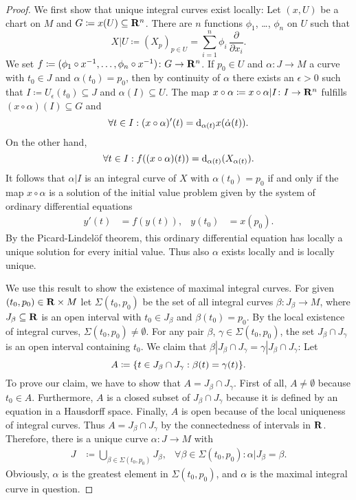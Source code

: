 \begin{proof}
  We first show that unique integral curves exist locally: Let $(x, U)$ be
  a chart on $M$ and $G \coloneqq x(U) \subseteq \mathbf{R}^n$. There are $n$
  functions $\phi_1$, \dots, $\phi_n$ on $U$ such that
  \[
    X|U \coloneqq (X_p)_{p \in U}
    = \sum_{i = 1}^n \phi_i \, \frac{\partial}{\partial x_i}.
  \]
  We set $f \coloneqq (\phi_1 \circ x^{-1}, \dotsc, \phi_n \circ x^{-1})
  \colon G \to \mathbf{R}^n$. If $p_0 \in U$ and $\alpha\colon J \to M$ a curve
  with $t_0 \in J$ and $\alpha(t_0) = p_0$, then by continuity of $\alpha$
  there exists an $\epsilon > 0$ such that
  $I \coloneqq U_\epsilon(t_0) \subseteq J$ and $\alpha(I) \subseteq U$. The
  map $x \circ \alpha \coloneqq x \circ \alpha|I\colon I \to \mathbf{R}^n$ fulfills
  $(x \circ \alpha)(I) \subseteq G$ and
  \[
    \forall t \in I : (x \circ \alpha)'(t) = \mathrm d_{\alpha(t)} x(\dot\alpha(t)).
  \]
  On the other hand,
  \[
    \forall t \in I: f((x \circ \alpha)(t)) = \mathrm d_{\alpha(t)}(X_{\alpha(t)}).
  \] 
  It follows that $\alpha|I$ is an integral curve of $X$ with $\alpha(t_0) = p_0$
  if and only if the map $x \circ \alpha$ is a solution of the initial
  value problem given by the system
  of ordinary differential equations
  \begin{align}
    \label{eq:ode}
    y'(t) & = f(y(t)), & y(t_0) & = x(p_0).
  \end{align}
  By the Picard-Lindelöf theorem, this ordinary differential equation has
  locally a unique solution for every initial value. Thus also $\alpha$ exists
  locally and is locally unique. 

  We use this result to show the existence of maximal integral curves. For given
  $(t_0, p_0) \in \mathbf{R} \times M$ let $\Sigma(t_0, p_0)$ be the set of all
  integral curves $\beta\colon J_\beta \to M$, where $J_\beta \subseteq \mathbf{R}$
  is an open interval with $t_0 \in J_\beta$ and $\beta(t_0) = p_0$.
  By the local existence of integral curves, $\Sigma(t_0, p_0) \neq \emptyset$.
  For any pair $\beta$, $\gamma \in \Sigma(t_0, p_0)$, the set $J_\beta \cap
  J_\gamma$ is an open interval containing $t_0$. We claim that $\beta|J_\beta
  \cap J_\gamma = \gamma|J_\beta \cap J_\gamma$: Let
  \[
    A \coloneqq \lbrace t \in J_\beta \cap J_\gamma : \beta(t) = \gamma(t)\rbrace.
  \]
  To prove our claim, we have to show that $A = J_\beta \cap J_\gamma$. First
  of all, $A \neq \emptyset$ because $t_0 \in A$. Furthermore, $A$ is a closed
  subset of $J_\beta \cap J_\gamma$ because it is defined by an equation in a
  Hausdorff space. Finally, $A$ is open because of the local uniqueness of
  integral curves. Thus $A = J_\beta \cap J_\gamma$ by the connectedness of
  intervals in $\mathbf{R}$. Therefore, there is a unique curve $\alpha\colon J \to
  M$ with
  \begin{align*}
    J & \coloneqq \bigcup_{\beta \in \Sigma(t_0, p_0)} J_\beta,&
    \forall \beta \in \Sigma(t_0, p_0): \alpha|J_\beta = \beta.
  \end{align*}
  Obviously, $\alpha$ is the greatest element in $\Sigma(t_0, p_0)$, and
  $\alpha$ is the maximal integral curve in question.


\end{proof}
